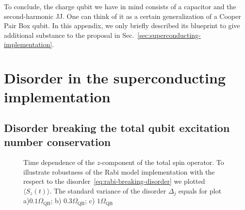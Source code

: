 \documentclass[reprint, aps, prx, amsmath, amssymb, longbibliography, superscriptaddress]{revtex4-2}
\begin{document}
To conclude, the charge qubit we have in mind consists of a capacitor and the second-harmonic JJ. One can think of it as a certain generalization of a Cooper Pair Box qubit. In this appendix, we only briefly described its blueprint to give additional substance to the proposal in Sec.~\ref{sec:superconducting-implementation}.


\section{Disorder in the superconducting implementation}
\label{app:disorder}
\subsection{Disorder breaking the total qubit excitation number conservation}


\begin{figure}[th]
    \captionsetup[subfloat]{captionskip=-135pt} %
    \centering
    \caption{Time dependence of the $z$-component of the total spin operator. To illustrate robustness of the Rabi model implementation with the respect to the disorder~\eqref{eq:rabi-breaking-disorder} we plotted $\langle S_z(t) \rangle$. The standard variance of the disorder $\Delta_j$  equals for plot a)$ 0.1 \Omega_{\text{QB}}$; b) $0.3\Omega_{\text{QB}}$; c) $1\Omega_{\text{QB}}$}
    \label{fig:spin-excitation-plot}
\end{figure}
\end{document}
